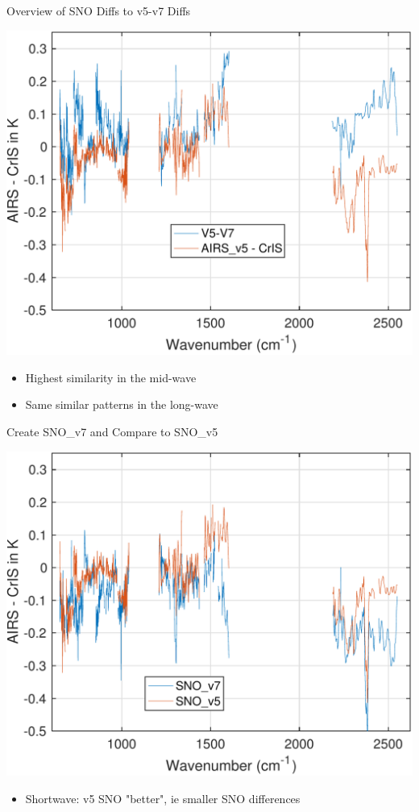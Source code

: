 \documentclass[10pt,t]{beamer}
\begin{document}
\begin{frame}[label={sec:orgc33581c}]{Overview of SNO Diffs to v5-v7 Diffs}
\vspace{-0.1in}
\begin{center}
\includegraphics[width=0.75\linewidth]{./Figs/Pdf/airs_v5_sno_minus_cris_and_v5_minus_v7.pdf}
\end{center}

\vspace{-0.1in}
\begin{itemize}
\item Highest similarity in the mid-wave
\item Same similar patterns in the long-wave
\end{itemize}
\end{frame}

\begin{frame}[label={sec:org6b8d527}]{Create SNO\_v7 and Compare to SNO\_v5}
\vspace{-0.1in}
\begin{center}
\includegraphics[width=0.75\linewidth]{./Figs/Pdf/airs_v7_sno_and_airs_v5_sno.pdf}
\end{center}

\vspace{-0.1in}
\begin{itemize}
\item Shortwave: v5 SNO "better", ie smaller SNO differences
\end{itemize}
\end{frame}
\end{document}
